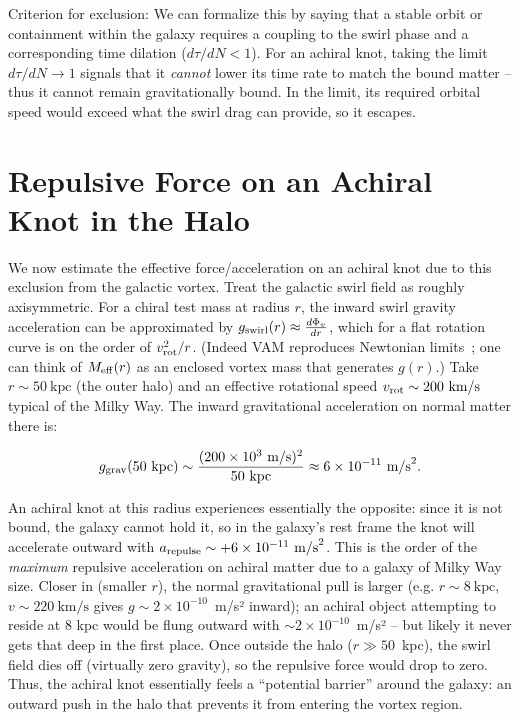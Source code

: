 Criterion for exclusion: We can formalize this by saying that a stable orbit or containment within the galaxy requires a coupling to the swirl phase and a corresponding time dilation ($d\tau/dN < 1$). For an achiral knot, taking the limit $d\tau/dN \to 1$ signals that it \textit{cannot} lower its time rate to match the bound matter -- thus it cannot remain gravitationally bound. In the limit, its required orbital speed would exceed what the swirl drag can provide, so it escapes.

\section*{Repulsive Force on an Achiral Knot in the Halo}

We now estimate the effective force/acceleration on an achiral knot due to this exclusion from the galactic vortex. Treat the galactic swirl field as roughly axisymmetric. For a chiral test mass at radius $r$, the inward swirl gravity acceleration can be approximated by $g_{\rm swirl}(r) \approx \frac{d\Phi_v}{dr}$, which for a flat rotation curve is on the order of $v_{\rm rot}^2/r$. (Indeed VAM reproduces Newtonian limits~\cite{iskandarani2025vam2}; one can think of $M_{\rm eff}(r)$ as an enclosed vortex mass that generates $g(r)$.) Take $r \sim 50~\text{kpc}$ (the outer halo) and an effective rotational speed $v_{\rm rot}\sim 200~\text{km/s}$ typical of the Milky Way. The inward gravitational acceleration on normal matter there is:

\[
g_{\rm grav}(50~\text{kpc}) \sim \frac{(200\times10^3~\text{m/s})^2}{50~\text{kpc}} \approx 6\times10^{-11}~\text{m/s}^2.
\]

An achiral knot at this radius experiences essentially the opposite: since it is not bound, the galaxy cannot hold it, so in the galaxy’s rest frame the knot will accelerate outward with $a_{\rm repulse} \sim +6\times10^{-11}~\text{m/s}^2$. This is the order of the \textit{maximum} repulsive acceleration on achiral matter due to a galaxy of Milky Way size. Closer in (smaller $r$), the normal gravitational pull is larger (e.g. $r\sim 8~\text{kpc}$, $v\sim220~\text{km/s}$ gives $g\sim2\times10^{-10}$~m/s² inward); an achiral object attempting to reside at 8 kpc would be flung outward with $\sim2\times10^{-10}$~m/s² – but likely it never gets that deep in the first place. Once outside the halo ($r \gg 50$~kpc), the swirl field dies off (virtually zero gravity), so the repulsive force would drop to zero. Thus, the achiral knot essentially feels a “potential barrier” around the galaxy: an outward push in the halo that prevents it from entering the vortex region.

